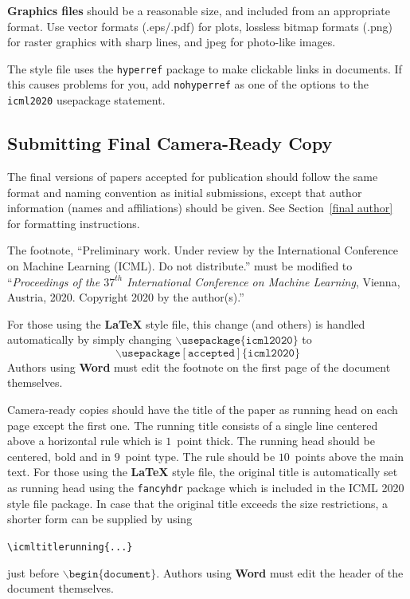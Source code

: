\documentclass{article}
\begin{document}
\textbf{Graphics files} should be a reasonable size, and included from
an appropriate format. Use vector formats (.eps/.pdf) for plots,
lossless bitmap formats (.png) for raster graphics with sharp lines, and
jpeg for photo-like images.

The style file uses the \texttt{hyperref} package to make clickable
links in documents. If this causes problems for you, add
\texttt{nohyperref} as one of the options to the \texttt{icml2020}
usepackage statement.


\subsection{Submitting Final Camera-Ready Copy}

The final versions of papers accepted for publication should follow the
same format and naming convention as initial submissions, except that
author information (names and affiliations) should be given. See
Section~\ref{final author} for formatting instructions.

The footnote, ``Preliminary work. Under review by the International
Conference on Machine Learning (ICML). Do not distribute.'' must be
modified to ``\textit{Proceedings of the
$\mathit{37}^{th}$ International Conference on Machine Learning},
Vienna, Austria, 2020.
Copyright 2020 by the author(s).''

For those using the \textbf{\LaTeX} style file, this change (and others) is
handled automatically by simply changing
$\mathtt{\backslash usepackage\{icml2020\}}$ to
$$\mathtt{\backslash usepackage[accepted]\{icml2020\}}$$
Authors using \textbf{Word} must edit the
footnote on the first page of the document themselves.

Camera-ready copies should have the title of the paper as running head
on each page except the first one. The running title consists of a
single line centered above a horizontal rule which is $1$~point thick.
The running head should be centered, bold and in $9$~point type. The
rule should be $10$~points above the main text. For those using the
\textbf{\LaTeX} style file, the original title is automatically set as running
head using the \texttt{fancyhdr} package which is included in the ICML
2020 style file package. In case that the original title exceeds the
size restrictions, a shorter form can be supplied by using

\verb|\icmltitlerunning{...}|

just before $\mathtt{\backslash begin\{document\}}$.
Authors using \textbf{Word} must edit the header of the document themselves.
\end{document}
